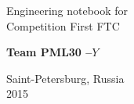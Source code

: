 \begin{titlepage}
\begin{center}
		\LARGE{Engineering notebook for \\ Competition First FTC}
		
		\vspace{2em}
		
		\bf\fontsize{50}{60}\selectfont Team PML30 --${Y}$ \\  \fontsize{11}{13}\selectfont
		
		\vspace{6em}
		
		\begin{figure}[H]
		\end{figure}
		
		\LARGE\normalfont Saint-Petersburg, Russia	\\ 2015
	\end{center}
\end{titlepage}

\newpage


